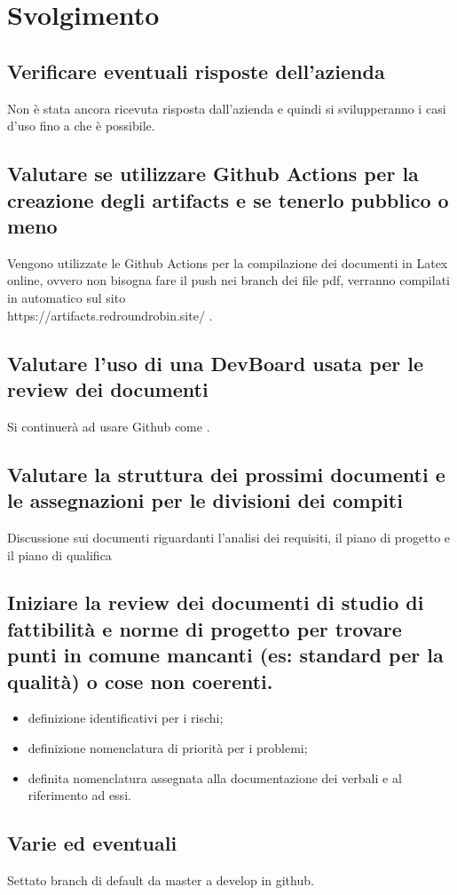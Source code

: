 \newpage
\section*{Svolgimento}

	\subsection*{Verificare eventuali risposte dell'azienda}
		Non è stata ancora ricevuta risposta dall'azienda e quindi si svilupperanno i casi d'uso fino a che è possibile.
	\subsection*{Valutare se utilizzare Github Actions per la creazione degli artifacts e se tenerlo pubblico o meno}
		Vengono utilizzate le Github Actions per la compilazione dei documenti in Latex online, ovvero non bisogna fare il push nei branch dei file pdf, verranno compilati in automatico sul sito \\ https://artifacts.redroundrobin.site/ .
	\subsection*{Valutare l'uso di una DevBoard usata per le review dei documenti}
		Si continuerà ad usare Github come .
	\subsection*{Valutare la struttura dei prossimi documenti e le assegnazioni per le divisioni dei compiti}
		Discussione sui documenti riguardanti l'analisi dei requisiti, il piano di progetto e il piano di qualifica
	\subsection*{Iniziare la review dei documenti di studio di fattibilità e norme di progetto per trovare punti in comune mancanti (es: standard per la qualità) o cose non coerenti.}
		\begin{itemize}
			\item definizione identificativi per i rischi;
			\item definizione nomenclatura di priorità per i problemi;
			\item definita nomenclatura assegnata alla documentazione dei verbali e al riferimento ad essi.
		\end{itemize}
	\subsection*{Varie ed eventuali}
		Settato branch di default da master a develop in github.